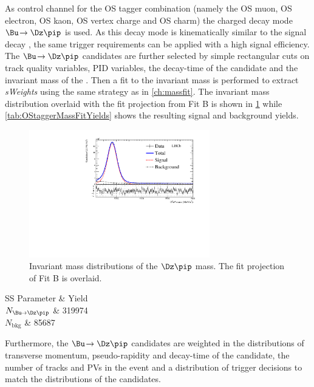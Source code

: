 As control channel for the OS tagger combination (namely the OS muon, OS electron, OS kaon, OS vertex charge and OS charm) the charged decay mode $\Bu\!\to\Dz\pip$ is used.
As this decay mode is kinematically  similar to the signal decay \BdToDpi, the same trigger requirements can be applied with a high signal efficiency.
The $\Bu\!\to\Dz\pip$ candidates are further selected by simple rectangular cuts on track quality variables, PID variables, the decay-time of the \B candidate and the invariant mass of the \Dz.
Then a fit to the invariant \Bu mass is performed to extract \emph{sWeights} using the same strategy as in \cref{ch:massfit}.
The invariant mass distribution overlaid with the fit projection from Fit B is shown in \cref{fig:OStaggerMassFit} while \cref{tab:OStaggerMassFitYields} shows the resulting signal and background yields.
\begin{figure}[tbp]
	\begin{center}
		\includegraphics[width=0.7\textwidth]{09FlavourTagging/figs/MDFitForSWeights_BeautyMass_Bu2D0Pi.pdf}
	\end{center}
	\caption{Invariant mass distributions of the $\Dz\pip$ mass.
    The fit projection of Fit B is overlaid.}
	\label{fig:OStaggerMassFit}
\end{figure}
\begin{table}
	\begin{center}
	\caption{Fitted yields of the $\Bu\!\to\Dz\pip$ control channel from Fit B.}
	\begin{tabular}{SS}
		\toprule
		{Parameter} & {Yield} \\
		\midrule
		{$N_{\Bu\!\to\Dz\pip}$}	& 319974 \\
		{$N_{\text{bkg}}$}		& 85687 \\
		\bottomrule
	\end{tabular}
	\label{tab:OStaggerMassFitYields}
  \end{center}
\end{table}
Furthermore, the $\Bu\!\to\Dz\pip$ candidates are weighted in the distributions of transverse momentum, pseudo-rapidity and decay-time of the \B candidate, the number of tracks and PVs in the event and a distribution of trigger decisions to match the distributions of the \BdToDpi candidates.

